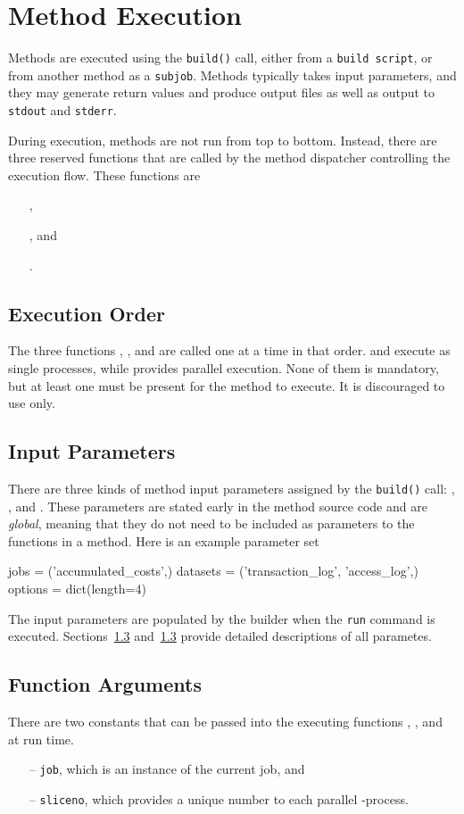 \section{Method Execution}
Methods are executed using the \texttt{build()} call, either from a
\texttt{build script}, or from another method as a \texttt{subjob}.
Methods typically takes input parameters, and they may generate return
values and produce output files as well as output to \texttt{stdout}
and \texttt{stderr}.

During execution, methods are not run from top to bottom.  Instead,
there are three reserved functions that are called by the method
dispatcher controlling the execution flow.  These functions are
\begin{itemize}
\item [] \prepare,
\item [] \analysis, and
\item [] \synthesis.
\end{itemize}


\subsection{Execution Order}
The three functions \prepare, \analysis, and \synthesis are called one
at a time in that order.  \prepare and \synthesis execute as single
processes, while \analysis provides parallel execution.  None of them
is mandatory, but at least one must be present for the method to
execute.  It is discouraged to use \prepare only.


\subsection{Input Parameters}
There are three kinds of method input parameters assigned by the
\texttt{build()} call: \jobs, \datasets, and \options.  These
parameters are stated early in the method source code and are
\textsl{global}, meaning that they do not need to be included as
parameters to the functions in a method.  Here is an example parameter
set
\begin{python}
jobs = ('accumulated_costs',)
datasets = ('transaction_log', 'access_log',)
options = dict(length=4)
\end{python}
The input parameters are populated by the builder when the
\texttt{run} command is executed.  Sections~\ref{} and~\ref{} provide
detailed descriptions of all parametes.



\subsection{Function Arguments}
There are two constants that can be passed into the executing
functions \prepare, \analysis, and \synthesis at run time.
\begin{itemize}
\item[--] \texttt{job}, which is an instance of the current job, and
\item[--] \texttt{sliceno}, which provides a unique number to each
  parallel \analysis-process.
\end{itemize}

